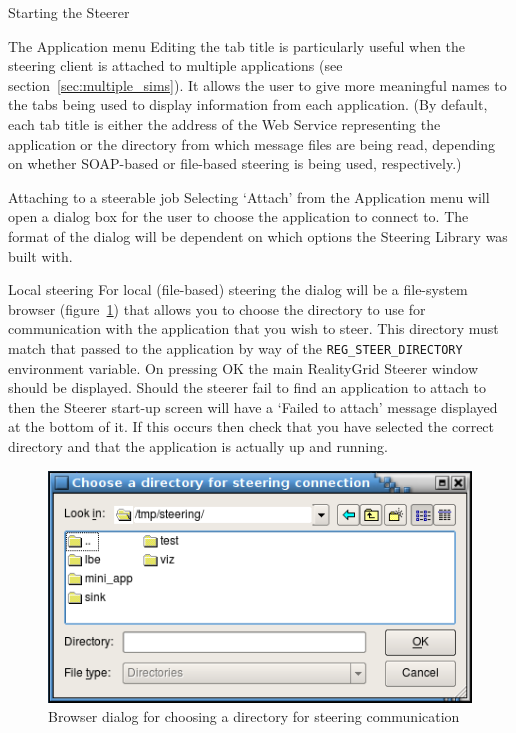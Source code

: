 \documentclass[a4paper,twoside]{article}
\begin{document}
\begin{section}{Starting the Steerer}
\begin{subsection}{The Application menu}
Editing the tab title is particularly useful when the steering client
is attached to multiple applications (see
section~\ref{sec:multiple_sims}).  It allows the user to give more
meaningful names to the tabs being used to display information from
each application.  (By default, each tab title is either the address
of the Web Service representing the application or the directory from
which message files are being read, depending on whether SOAP-based or
file-based steering is being used, respectively.)

\end{subsection}

\begin{subsection}{Attaching to a steerable job}
Selecting `Attach' from the Application menu will open a dialog box
for the user to choose the application to connect to. The format of
the dialog will be dependent on which options the Steering Library was
built with.

\begin{subsubsection}{Local steering}
For local (file-based) steering the dialog will be a file-system
browser (figure~\ref{fig:dir_browser}) that allows you to choose the
directory to use for communication with the application that you wish
to steer.  This directory must match that passed to the application by
way of the \texttt{REG\_\-STEER\_\-DIRECTORY} environment variable.
On pressing OK the main RealityGrid Steerer window should be
displayed.  Should the steerer fail to find an application to attach
to then the Steerer start-up screen will have a `Failed to attach'
message displayed at the bottom of it.  If this occurs then check that
you have selected the correct directory and that the application is
actually up and running.
\end{subsubsection}

\begin{figure}
\centerline{\includegraphics{dir_browser.png}}
\caption{Browser dialog for choosing a directory for steering communication}
\label{fig:dir_browser}
\end{figure}


\end{subsection}
\end{section}
\end{document}
